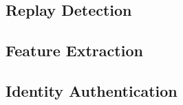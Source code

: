     \subsection{Replay Detection}
        
    \subsection{Feature Extraction}

    \subsection{Identity Authentication}

